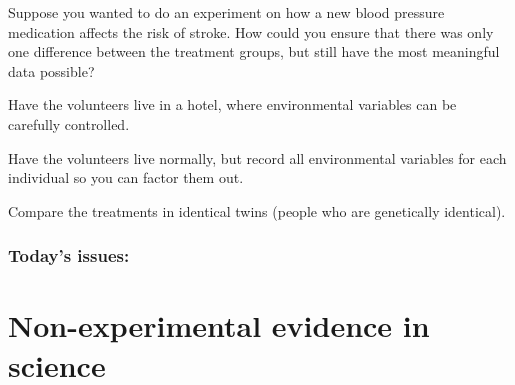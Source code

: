 


\blankslide

\begin{noheadline}
\begin{frame}
    \begin{clickerquestion}
        \item Suppose you wanted to do an experiment on how a new
            blood pressure medication affects the risk of stroke. How
            could you ensure that there was only one difference between
            the treatment groups, but still have the most meaningful data
            possible? 
        \begin{clickeroptions}
            \item {}
            \item Have the volunteers live in a hotel, where
                environmental variables can be carefully controlled. 
            \item Have the volunteers live normally, but record all
                environmental variables for each individual so you can
                factor them out. 
            \item Compare the treatments in identical twins (people
                who are genetically identical). 
        \end{clickeroptions}
    \end{clickerquestion}
\end{frame}
\end{noheadline}

\begin{noheadline}
\begin{frame}
\frametitle{Today's issues:}
\tableofcontents
\end{frame}
\end{noheadline}


\section{Non-experimental evidence in science}


